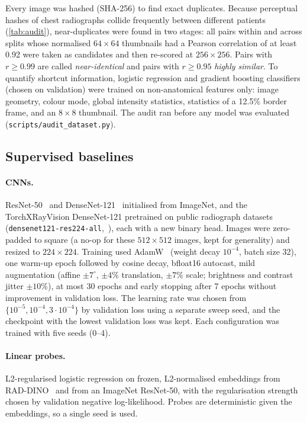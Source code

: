 \documentclass[11pt]{article}
\begin{document}
Every image was hashed (SHA-256) to find exact duplicates. Because perceptual hashes of chest
radiographs collide frequently between different patients (\cref{tab:audit}), near-duplicates
were found in two stages: all pairs within and across splits whose normalised $64\times64$
thumbnails had a Pearson correlation of at least 0.92 were taken as candidates and then
re-scored at $256\times256$. Pairs with $r\geq0.99$ are called \emph{near-identical} and pairs
with $r\geq0.95$ \emph{highly similar}. To quantify shortcut information, logistic regression
and gradient boosting classifiers (chosen on validation) were trained on non-anatomical features
only: image geometry, colour mode, global intensity statistics, statistics of a 12.5\% border
frame, and an $8\times8$ thumbnail. The audit ran before any model was evaluated
(\texttt{scripts/audit\_dataset.py}).

\subsection{Supervised baselines}

\paragraph{CNNs.} ResNet-50~\citep{he2016resnet} and DenseNet-121~\citep{huang2017densenet}
initialised from ImageNet, and the TorchXRayVision DenseNet-121 pretrained on public radiograph
datasets (\texttt{densenet121-res224-all},~\citealp{cohen2022torchxrayvision}), each with a new
binary head. Images were zero-padded to square (a no-op for these $512\times512$ images, kept
for generality) and resized to $224\times224$. Training used AdamW~\citep{loshchilov2019adamw}
(weight decay $10^{-4}$, batch size 32), one warm-up epoch followed by cosine decay, bfloat16
autocast, mild augmentation (affine $\pm7^\circ$, $\pm4\%$ translation, $\pm7\%$ scale;
brightness and contrast jitter $\pm10\%$), at most 30 epochs and early stopping after 7 epochs
without improvement in validation loss. The learning rate was chosen from
$\{10^{-5},10^{-4},3\cdot10^{-4}\}$ by validation loss using a separate sweep seed, and the
checkpoint with the lowest validation loss was kept. Each configuration was trained with five
seeds (0--4).

\paragraph{Linear probes.} L2-regularised logistic regression on frozen, L2-normalised
embeddings from RAD-DINO~\citep{perezgarcia2025raddino} and from an ImageNet ResNet-50, with the
regularisation strength chosen by validation negative log-likelihood. Probes are deterministic
given the embeddings, so a single seed is used.
\end{document}
